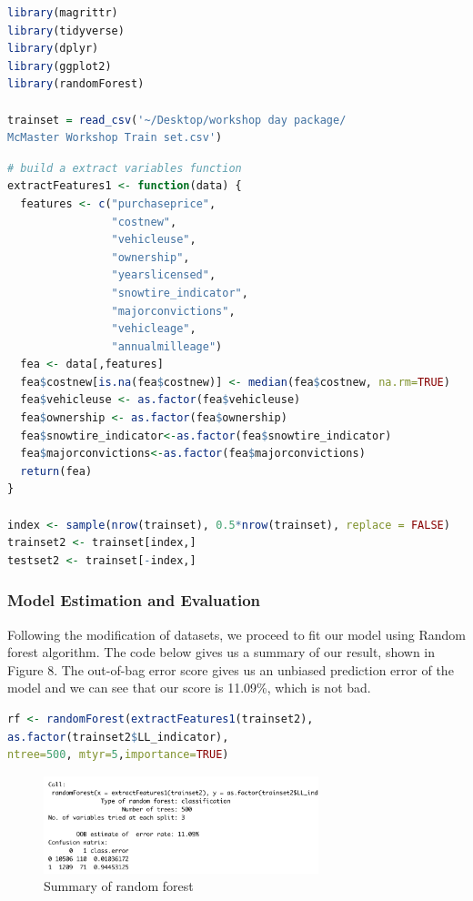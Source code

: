 \documentclass[12pt]{article} %
\theoremstyle{definition}
\begin{document}
\begin{lstlisting}[language=R,xleftmargin=.1\textwidth]
library(magrittr)
library(tidyverse)
library(dplyr)
library(ggplot2)
library(randomForest)

trainset = read_csv('~/Desktop/workshop day package/
McMaster Workshop Train set.csv')
\end{lstlisting}

\begin{lstlisting}[language=R,xleftmargin=.1\textwidth]
# build a extract variables function
extractFeatures1 <- function(data) {
  features <- c("purchaseprice",
                "costnew",
                "vehicleuse",
                "ownership",
                "yearslicensed",
                "snowtire_indicator",
                "majorconvictions",
                "vehicleage",
                "annualmilleage")
  fea <- data[,features]
  fea$costnew[is.na(fea$costnew)] <- median(fea$costnew, na.rm=TRUE)
  fea$vehicleuse <- as.factor(fea$vehicleuse)
  fea$ownership <- as.factor(fea$ownership)
  fea$snowtire_indicator<-as.factor(fea$snowtire_indicator)
  fea$majorconvictions<-as.factor(fea$majorconvictions)
  return(fea)
}

index <- sample(nrow(trainset), 0.5*nrow(trainset), replace = FALSE)
trainset2 <- trainset[index,]
testset2 <- trainset[-index,]
\end{lstlisting}

\newpage
\subsubsection{Model Estimation and Evaluation}
Following the modification of datasets, we proceed to fit our model using Random forest algorithm. The code below gives us a summary of our result, shown in Figure 8. The out-of-bag error score gives us an unbiased prediction error of the model and we can see that our score is 11.09\%, which is not bad.

\begin{lstlisting}[language=R,xleftmargin=.1\textwidth]
rf <- randomForest(extractFeatures1(trainset2),
as.factor(trainset2$LL_indicator), 
ntree=500, mtyr=5,importance=TRUE)
\end{lstlisting}

\begin{figure}[H]
    \centering
    \includegraphics[width=8cm]{Type.png}
    \caption{Summary of random forest}
    \label{fig:my_label}
\end{figure}
\end{document}
